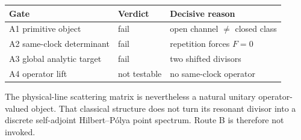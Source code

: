 \begin{center}
\begin{tabular}{@{}lll@{}}
\toprule
Gate & Verdict & Decisive reason \\
\midrule
A1 primitive object & fail & open channel $\ne$ closed class \\
A2 same-clock determinant & fail & repetition forces $F=0$ \\
A3 global analytic target & fail & two shifted divisors \\
A4 operator lift & not testable & no same-clock operator \\
\bottomrule
\end{tabular}
\end{center}

The physical-line scattering matrix is nevertheless a natural unitary
operator-valued object.  That classical structure does not turn its resonant
divisor into a discrete self-adjoint Hilbert--P\'olya point spectrum.  Route B
is therefore not invoked.
